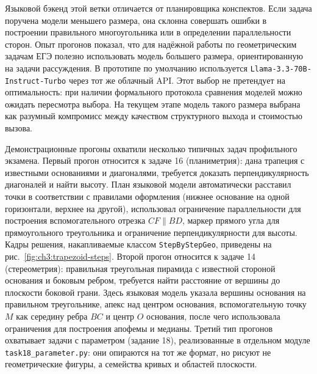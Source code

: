 Языковой бэкенд этой ветки отличается от планировщика конспектов. Если задача поручена модели меньшего размера, она склонна совершать ошибки в построении правильного многоугольника или в определении параллельности сторон. Опыт прогонов показал, что для надёжной работы по геометрическим задачам ЕГЭ полезно использовать модель большего размера, ориентированную на задачи рассуждения. В прототипе по умолчанию используется \texttt{Llama-3.3-70B-Instruct-Turbo} через тот же облачный API. Этот выбор не претендует на оптимальность: при наличии формального протокола сравнения моделей можно ожидать пересмотра выбора. На текущем этапе модель такого размера выбрана как разумный компромисс между качеством структурного выхода и стоимостью вызова.

Демонстрационные прогоны охватили несколько типичных задач профильного экзамена. Первый прогон относится к задаче 16 (планиметрия): дана трапеция с известными основаниями и диагоналями, требуется доказать перпендикулярность диагоналей и найти высоту. План языковой модели автоматически расставил точки в соответствии с правилами оформления (нижнее основание на одной горизонтали, верхнее на другой), использовал ограничение параллельности для построения вспомогательного отрезка \(CF \parallel BD\), маркер прямого угла для прямоугольного треугольника и ограничение перпендикулярности для высоты. Кадры решения, накапливаемые классом \texttt{StepByStepGeo}, приведены на рис.~\ref{fig:ch3:trapezoid-steps}. Второй прогон относится к задаче 14 (стереометрия): правильная треугольная пирамида с известной стороной основания и боковым ребром, требуется найти расстояние от вершины до плоскости боковой грани. Здесь языковая модель указала вершины основания на правильном треугольнике, апекс над центром основания, вспомогательную точку \(M\) как середину ребра \(BC\) и центр \(O\) основания, после чего использовала ограничения для построения апофемы и медианы. Третий тип прогонов охватывает задачи с параметром (задание 18), реализованные в отдельном модуле \texttt{task18\_parameter.py}: они опираются на тот же формат, но рисуют не геометрические фигуры, а семейства кривых и областей плоскости.

